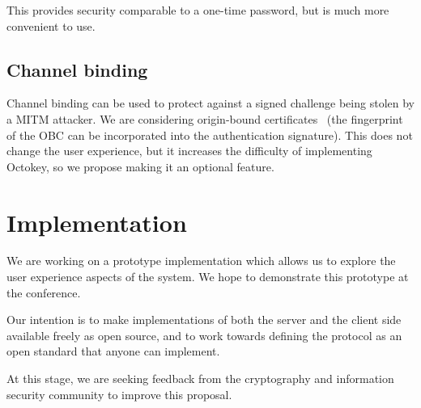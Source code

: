 \documentclass{acm_proc_article-sp}
\begin{document}
This provides security comparable to a one-time password, but is much more convenient to use.

\subsection{Channel binding}

Channel binding can be used to protect against a signed challenge being stolen by a MITM attacker.
We are considering origin-bound certificates~\cite{Dietz12} (the fingerprint of the OBC can be
incorporated into the authentication signature). This does not change the user experience, but it
increases the difficulty of implementing Octokey, so we propose making it an optional feature.

\section{Implementation}

We are working on a prototype implementation which allows us to explore the user experience aspects
of the system. We hope to demonstrate this prototype at the conference.

Our intention is to make implementations of both the server and the client side available freely as
open source, and to work towards defining the protocol as an open standard that anyone can
implement.

At this stage, we are seeking feedback from the cryptography and information security community to
improve this proposal.

{}

\end{document}
